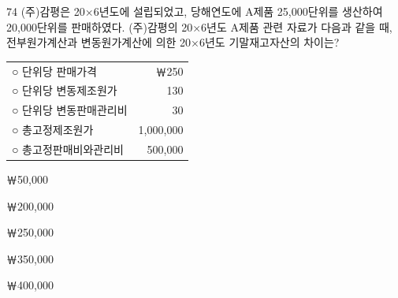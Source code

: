 \begin{question}{74}
(주)감평은 20×6년도에 설립되었고, 당해연도에 A제품 25,000단위를 생산하여 20,000단위를 판매하였다. (주)감평의 20×6년도 A제품 관련 자료가 다음과 같을 때, 전부원가계산과 변동원가계산에 의한 20×6년도 기말재고자산의 차이는?
\begin{framedtext}
\begin{tabularx}{\linewidth}{@{}Xr@{}}
○ 단위당 판매가격 & ￦250 \\
○ 단위당 변동제조원가 & 130 \\
○ 단위당 변동판매관리비 & 30 \\
○ 총고정제조원가 & 1,000,000 \\
○ 총고정판매비와관리비 & 500,000 \\
\end{tabularx}
\end{framedtext}
\begin{choices}
  \item ￦50,000
  \item ￦200,000
  \item ￦250,000
  \item ￦350,000
  \item ￦400,000
\end{choices}
\end{question}
